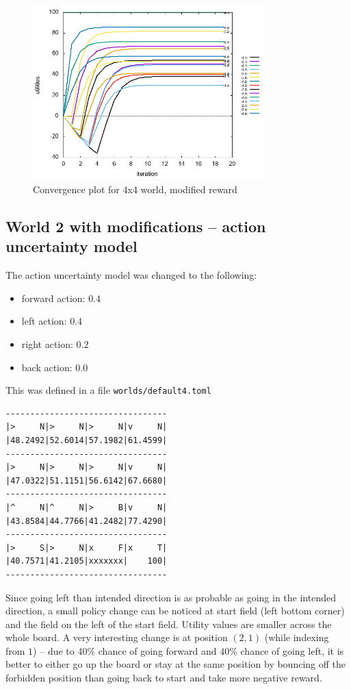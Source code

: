\documentclass[12pt,a4paper]{article} %
\begin{document}
\begin{figure}[H]
\centering
	\includegraphics[width=0.8\textwidth]{../results/default3.png}
	\caption{Convergence plot for 4x4 world, modified reward}
	\label{q3}
\end{figure}

\subsection{World 2 with modifications -- action uncertainty model}

The action uncertainty model was changed to the following:
\begin{itemize}
	\item forward action: $0.4$
	\item left action: $0.4$
	\item right action: $0.2$
	\item back action: $0.0$
\end{itemize}
This was defined in a file \texttt{worlds/default4.toml}
\newpage
\begin{lstlisting}[caption={Results of MDP utility value calculation for 4x4 world, modified action uncertainty model}]
---------------------------------
|>     N|>     N|>     N|v     N|
|48.2492|52.6014|57.1982|61.4599|
---------------------------------
|>     N|>     N|>     N|v     N|
|47.0322|51.1151|56.6142|67.6680|
---------------------------------
|^     N|^     N|>     B|v     N|
|43.8584|44.7766|41.2482|77.4290|
---------------------------------
|>     S|>     N|x     F|x     T|
|40.7571|41.2105|xxxxxxx|    100|
---------------------------------
\end{lstlisting}
Since going left than intended direction is as probable as going in the intended direction, a small policy change can be noticed at start field (left bottom corner) and the field on the left of the start field. Utility values are smaller across the whole board. A very interesting change is at position $(2,1)$ (while indexing from $1$) -- due to $40\%$ chance of going forward and $40\%$ chance of going left, it is better to either go up the board or stay at the same position by bouncing off the forbidden position than going back to start and take more negative reward.
\end{document}
